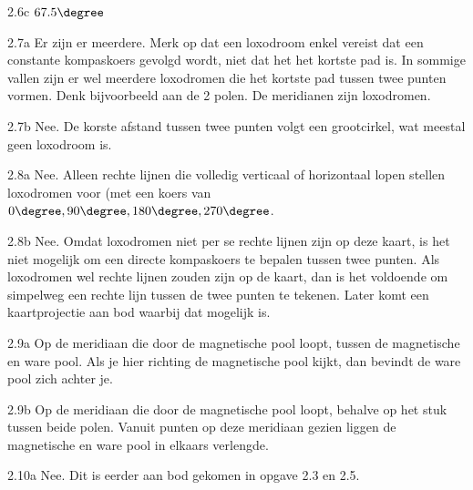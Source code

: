 \begin{Antwoord}{2.6c}
			$67.5\degree$
		
\end{Antwoord}
\begin{Antwoord}{2.7a}
			Er zijn er meerdere. Merk op dat een loxodroom enkel vereist dat een constante kompaskoers gevolgd wordt, niet dat het het kortste pad is. In sommige vallen zijn er wel meerdere loxodromen die het kortste pad tussen twee punten vormen. Denk bijvoorbeeld aan de 2 polen. De meridianen zijn loxodromen.
		
\end{Antwoord}
\begin{Antwoord}{2.7b}
			Nee. De korste afstand tussen twee punten volgt een grootcirkel, wat meestal geen loxodroom is.
		
\end{Antwoord}
\begin{Antwoord}{2.8a}
			Nee. Alleen rechte lijnen die volledig verticaal of horizontaal lopen stellen loxodromen voor (met een koers van $0\degree, 90\degree, 180\degree, 270\degree$.
		
\end{Antwoord}
\begin{Antwoord}{2.8b}
			Nee. Omdat loxodromen niet per se rechte lijnen zijn op deze kaart, is het niet mogelijk om een directe kompaskoers te bepalen tussen twee punten. Als loxodromen wel rechte lijnen zouden zijn op de kaart, dan is het voldoende om simpelweg een rechte lijn tussen de twee punten te tekenen. Later komt een kaartprojectie aan bod waarbij dat mogelijk is.
		
\end{Antwoord}
\begin{Antwoord}{2.9a}
			Op de meridiaan die door de magnetische pool loopt, tussen de magnetische en ware pool. Als je hier richting de magnetische pool kijkt, dan bevindt de ware pool zich achter je.
		
\end{Antwoord}
\begin{Antwoord}{2.9b}
			Op de meridiaan die door de magnetische pool loopt, behalve op het stuk tussen beide polen. Vanuit punten op deze meridiaan gezien liggen de magnetische en ware pool in elkaars verlengde.
		
\end{Antwoord}
\begin{Antwoord}{2.10a}
			Nee. Dit is eerder aan bod gekomen in opgave 2.3 en 2.5.
		
\end{Antwoord}
